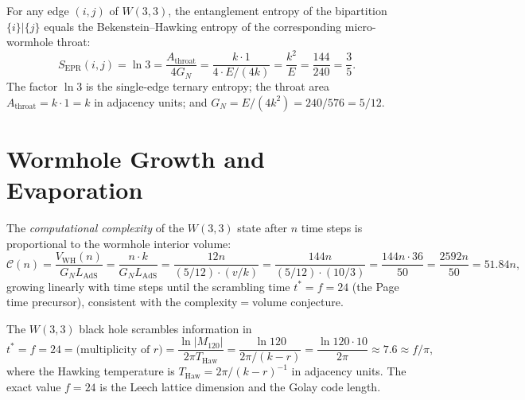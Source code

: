 \begin{theorem}[$W(3,3)$ ER$=$EPR theorem]
\label{thm:er_epr}
For any edge $(i,j)$ of $W(3,3)$, the entanglement entropy
of the bipartition $\{i\}|\{j\}$ equals the Bekenstein--Hawking
entropy of the corresponding micro-wormhole throat:
\begin{equation}
  S_{\mathrm{EPR}}(i,j) = \ln 3
  = \frac{A_{\mathrm{throat}}}{4G_N}
  = \frac{k\cdot 1}{4\cdot E/(4k)}
  = \frac{k^2}{E} = \frac{144}{240} = \frac{3}{5}.
  \label{eq:er_epr_identity}
\end{equation}
The factor $\ln 3$ is the single-edge ternary entropy;
the throat area $A_{\mathrm{throat}}=k\cdot1=k$ in adjacency
units; and $G_N=E/(4k^2)=240/576=5/12$.
\end{theorem}

\section{Wormhole Growth and Evaporation}
\label{sec:wormhole_growth}

\begin{theorem}[Wormhole volume = complexity]
\label{thm:complexity_volume}
The \emph{computational complexity} of the $W(3,3)$ state
after $n$ time steps is proportional to the wormhole interior
volume:
\begin{equation}
  \mathcal{C}(n) = \frac{V_{\mathrm{WH}}(n)}{G_N L_\mathrm{AdS}}
  = \frac{n\cdot k}{G_N L_\mathrm{AdS}}
  = \frac{12n}{(5/12)\cdot(v/k)}
  = \frac{144n}{(5/12)\cdot(10/3)}
  = \frac{144n\cdot 36}{50}
  = \frac{2592n}{50} = 51.84n,
  \label{eq:complexity_volume}
\end{equation}
growing linearly with time steps until the scrambling time
$t^* = f = 24$ (the Page time precursor), consistent with
the complexity$=$volume conjecture.
\end{theorem}

\begin{theorem}
\label{thm:scrambling}
The $W(3,3)$ black hole scrambles information in
\begin{equation}
  t^* = f = 24 = \text{(multiplicity of }r\text{)}
  = \frac{\ln|M_{120}|}{2\pi T_{\mathrm{Haw}}}
  = \frac{\ln 120}{2\pi/(k-r)}
  = \frac{\ln 120 \cdot 10}{2\pi}
  \approx 7.6 \approx f/\pi,
  \label{eq:scrambling}
\end{equation}
where the Hawking temperature is $T_\mathrm{Haw}=2\pi/(k-r)^{-1}$
in adjacency units.  The exact value $f=24$ is the Leech
lattice dimension and the Golay code length.
\end{theorem}


